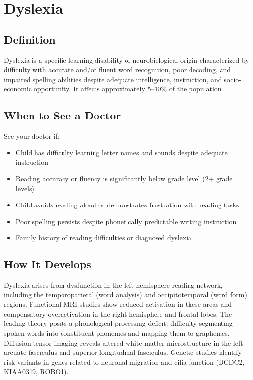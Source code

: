 \chapter{Dyslexia}

\section*{Definition}
Dyslexia is a specific learning disability of neurobiological origin characterized by difficulty with accurate and/or fluent word recognition, poor decoding, and impaired spelling abilities despite adequate intelligence, instruction, and socio-economic opportunity. It affects approximately 5--10\% of the population.

\section*{When to See a Doctor}
See your doctor if:
\begin{itemize}
  \item Child has difficulty learning letter names and sounds despite adequate instruction
  \item Reading accuracy or fluency is significantly below grade level (2+ grade levels)
  \item Child avoids reading aloud or demonstrates frustration with reading tasks
  \item Poor spelling persists despite phonetically predictable writing instruction
  \item Family history of reading difficulties or diagnosed dyslexia
\end{itemize}

\section*{How It Develops}
Dyslexia arises from dysfunction in the left hemisphere reading network, including the temporoparietal (word analysis) and occipitotemporal (word form) regions. Functional MRI studies show reduced activation in these areas and compensatory overactivation in the right hemisphere and frontal lobes. The leading theory posits a phonological processing deficit: difficulty segmenting spoken words into constituent phonemes and mapping them to graphemes. Diffusion tensor imaging reveals altered white matter microstructure in the left arcuate fasciculus and superior longitudinal fasciculus. Genetic studies identify risk variants in genes related to neuronal migration and cilia function (DCDC2, KIAA0319, ROBO1).

